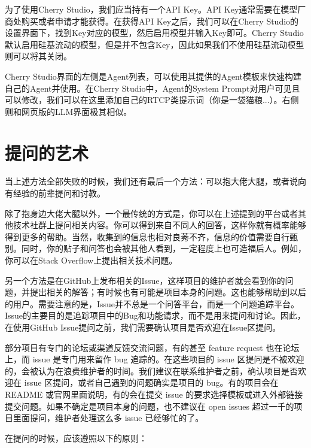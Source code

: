 \documentclass[../main.tex]{subfiles}
\begin{document}
为了使用Cherry Studio，我们应当持有一个API Key。API Key通常需要在模型厂商处购买或者申请才能获得。在获得API Key之后，我们可以在Cherry Studio的设置界面下，找到Key对应的模型，然后启用模型并输入Key即可。Cherry Studio默认启用硅基流动的模型，但是并不包含Key，因此如果我们不使用硅基流动模型则可以将其关闭。

Cherry Studio界面的左侧是Agent列表，可以使用其提供的Agent模板来快速构建自己的Agent并使用。在Cherry Studio中，Agent的System Prompt对用户可见且可以修改，我们可以在这里添加自己的RTCP类提示词（你是一袋猫粮...）。右侧则和网页版的LLM界面极其相似。

\section{提问的艺术}

当上述方法全部失败的时候，我们还有最后一个方法：可以抱大佬大腿，或者说向有经验的前辈提问和讨教。

除了抱身边大佬大腿以外，一个最传统的方式是，你可以在上述提到的平台或者其他技术社群上提问相关内容。你可以得到来自不同人的回答，这样你就有概率能够得到更多的帮助。当然，收集到的信息也相对良莠不齐，信息的价值需要自行甄别。同时，你的贴子和问答也会被其他人看到，一定程度上也可造福后人。例如，你可以在Stack Overflow上提出相关技术问题。

另一个方法是在GitHub上发布相关的Issue，这样项目的维护者就会看到你的问题，并提出相关的解答；有时候也有可能是项目本身的问题。这也能够帮助到以后的用户。需要注意的是，Issue并不总是一个问答平台，而是一个问题追踪平台。Issue的主要目的是追踪项目中的Bug和功能请求，而不是用来提问和讨论。因此，在使用GitHub Issue提问之前，我们需要确认项目是否欢迎在Issue区提问。

部分项目有专门的论坛或渠道反馈交流问题，有的甚至 feature request 也在论坛上，而 issue 是专门用来留作 bug 追踪的。在这些项目的 issue 区提问是不被欢迎的，会被认为在浪费维护者的时间。我们建议在联系维护者之前，确认项目是否欢迎在 issue 区提问，或者自己遇到的问题确实是项目的 bug。有的项目会在 README 或官网里面说明，有的会在提交 issue 的要求选择模板或进入外部链接提交问题。如果不确定是项目本身的问题，也不建议在 open issues 超过一千的项目里面提问，维护者处理这么多 issue 已经够忙的了。

在提问的时候，应该遵照以下的原则：
\end{document}
